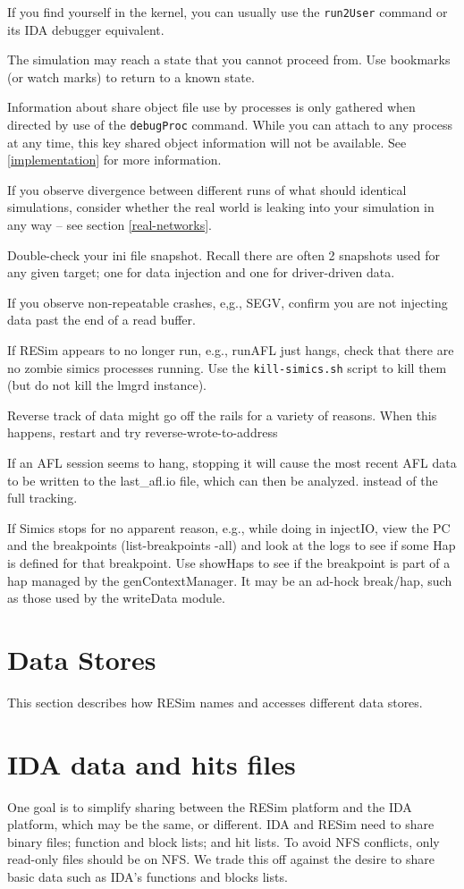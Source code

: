 \documentclass[titlepage]{article}
\begin{document}
If you find yourself in the kernel, you can usually use the {\tt run2User} command or its IDA debugger equivalent.

The simulation may reach a state that you cannot proceed from.  Use bookmarks (or watch marks) to return to a known state.

Information about share object file use by processes is only gathered when directed by use of the {\tt debugProc} command.
While you can attach to any process at any time, this key shared object information will not be available.  See \ref{implementation}
for more information.

If you observe divergence between different runs of what should identical simulations, consider whether the real world is leaking
into your simulation in any way -- see section \ref{real-networks}.

Double-check your ini file snapshot.  Recall there are often 2 snapshots used for any given target; one for data injection and one for 
driver-driven data.

If you observe non-repeatable crashes, e,g., SEGV, confirm you are not injecting data past the end of a read buffer.

If RESim appears to no longer run, e.g., runAFL just hangs, check that there are no zombie simics processes running.  Use
the {\tt kill-simics.sh} script to kill them (but do not kill the lmgrd instance).

Reverse track of data might go off the rails for a variety of reasons.  When this happens, restart and try reverse-wrote-to-address

If an AFL session seems to hang, stopping it will cause the most recent AFL data to be written to the last\_afl.io file, which can then
be analyzed.
instead of the full tracking.

If Simics stops for no apparent reason, e.g., while doing in injectIO, view the PC and the breakpoints (list-breakpoints -all)
and look at the logs to see if some Hap is defined for that breakpoint.  Use showHaps to see if the breakpoint is part of a hap
managed by the genContextManager.  It may be an ad-hock break/hap, such as those used by the writeData module.

\section{Data Stores}
\label{data-stores}
This section describes how RESim names and accesses different data stores.

\section{IDA data and hits files}
One goal is to simplify sharing between the RESim platform and the IDA platform,
which may be the same, or different.  IDA and RESim need to share binary files; function and block lists; and hit lists.
To avoid NFS conflicts, only read-only files should be on NFS. We trade this off against
the desire to share basic data such as IDA's functions and blocks lists.  
\end{document}
